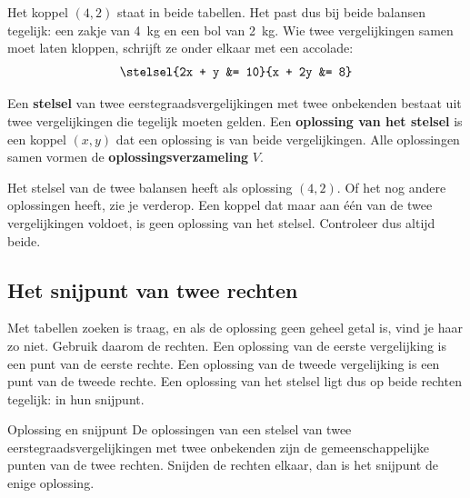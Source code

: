Het koppel $(4, 2)$ staat in beide tabellen. Het past dus bij beide balansen tegelijk: een zakje van 4~kg en een bol van 2~kg. Wie twee vergelijkingen samen moet laten kloppen, schrijft ze onder elkaar met een accolade:
\[ \stelsel{2x + y &= 10}{x + 2y &= 8} \]

\begin{theorie}
Een \textbf{\textcolor{accent}{stelsel}} van twee eerstegraadsvergelijkingen met twee onbekenden bestaat uit twee vergelijkingen die tegelijk moeten gelden. Een \textbf{\textcolor{accent}{oplossing van het stelsel}} is een koppel $(x, y)$ dat een oplossing is van beide vergelijkingen. Alle oplossingen samen vormen de \textbf{\textcolor{accent}{oplossingsverzameling}} $V$.
\end{theorie}

Het stelsel van de twee balansen heeft als oplossing $(4, 2)$. Of het nog andere oplossingen heeft, zie je verderop. Een koppel dat maar aan één van de twee vergelijkingen voldoet, is geen oplossing van het stelsel. Controleer dus altijd beide.


\begin{oefeningen}
\end{oefeningen}

\subsection{Het snijpunt van twee rechten}

Met tabellen zoeken is traag, en als de oplossing geen geheel getal is, vind je haar zo niet. Gebruik daarom de rechten. Een oplossing van de eerste vergelijking is een punt van de eerste rechte. Een oplossing van de tweede vergelijking is een punt van de tweede rechte. Een oplossing van het stelsel ligt dus op beide rechten tegelijk: in hun snijpunt.

\begin{theorie}
\begin{stelling}{Oplossing en snijpunt}
De oplossingen van een stelsel van twee eerstegraadsvergelijkingen met twee onbekenden zijn de gemeenschappelijke punten van de twee rechten. Snijden de rechten elkaar, dan is het snijpunt de enige oplossing.
\end{stelling}
\end{theorie}

